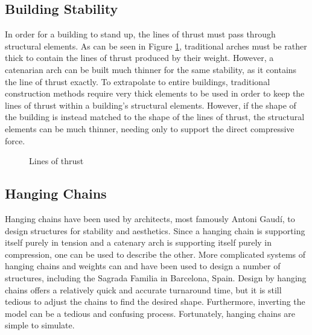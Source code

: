\documentclass{thesis}
\begin{document}
\subsection{Building Stability} \label{stability}
In order for a building to stand up, the lines of thrust must pass through structural elements.  As can be seen in Figure \ref{FIGURE_arch_lines},
traditional arches must be rather thick to contain the lines of thrust produced by their weight.  However, a catenarian arch can be built
much thinner for the same stability, as it contains the line of thrust exactly.
To extrapolate to entire buildings, traditional construction methods require very thick elements to be used in order to keep the lines of thrust
within a building's structural elements.  However, if the shape of the building is instead matched to the shape of the lines of thrust, the
structural elements can be much thinner, needing only to support the direct compressive force.
\begin{figure}
\caption{Lines of thrust}
\label{FIGURE_arch_lines}
\end{figure}

\subsection{Hanging Chains}
Hanging chains have been used by architects, most famously Antoni Gaud\'{i}, to design structures for stability and aesthetics.  Since a hanging
chain is supporting itself purely in tension and a catenary arch is supporting itself purely in compression, one can be used to describe the other.
More complicated systems of hanging chains and weights can and have been used to design a number of structures, including the Sagrada Familia in
Barcelona, Spain.  Design by hanging chains offers a relatively quick and accurate turnaround time, but it is still tedious to adjust the chains
to find the desired shape.  Furthermore, inverting the model can be a tedious and confusing process.  Fortunately, hanging chains are simple to simulate.
\end{document}
